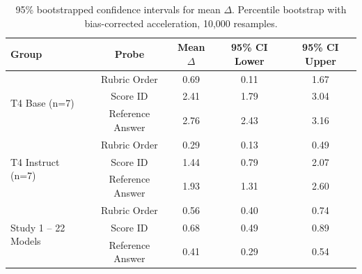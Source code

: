 \begin{table}[h]
\centering\small
\caption{95\% bootstrapped confidence intervals for mean $\Delta$.
Percentile bootstrap with bias-corrected acceleration, 10,000 resamples.}
\label{tab:bootstrapped}
\begin{tabular}{lcccc}
\toprule
\textbf{Group} & \textbf{Probe} & \textbf{Mean $\Delta$} & \textbf{95\% CI Lower} & \textbf{95\% CI Upper} \\
\midrule
\multirow{3}{*}{T4 Base (n=7)}
 & Rubric Order & 0.69 & 0.11 & 1.67 \\
 & Score ID & 2.41 & 1.79 & 3.04 \\
 & Reference Answer & 2.76 & 2.43 & 3.16 \\
\midrule
\multirow{3}{*}{T4 Instruct (n=7)}
 & Rubric Order & 0.29 & 0.13 & 0.49 \\
 & Score ID & 1.44 & 0.79 & 2.07 \\
 & Reference Answer & 1.93 & 1.31 & 2.60 \\
\midrule
\multirow{3}{*}{Study 1 -- 22 Models}
 & Rubric Order & 0.56 & 0.40 & 0.74 \\
 & Score ID & 0.68 & 0.49 & 0.89 \\
 & Reference Answer & 0.41 & 0.29 & 0.54 \\
\bottomrule
\end{tabular}
\end{table}
